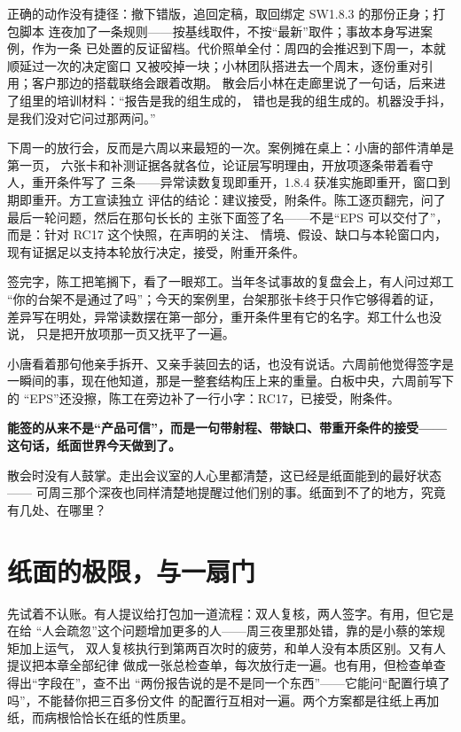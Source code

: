 正确的动作没有捷径：撤下错版，追回定稿，取回绑定 SW1.8.3 的那份正身；打包脚本
连夜加了一条规则——按基线取件，不按“最新”取件；事故本身写进案例，作为一条
已处置的反证留档。代价照单全付：周四的会推迟到下周一，本就顺延过一次的决定窗口
又被咬掉一块；小林团队搭进去一个周末，逐份重对引用；客户那边的搭载联络会跟着改期。
散会后小林在走廊里说了一句话，后来进了组里的培训材料：“报告是我的组生成的，
错也是我的组生成的。机器没手抖，是我们没对它问过那两问。”

下周一的放行会，反而是六周以来最短的一次。案例摊在桌上：小唐的部件清单是第一页，
六张卡和补测证据各就各位，论证层写明理由，开放项逐条带着看守人，重开条件写了
三条——异常读数复现即重开，1.8.4 获准实施即重开，窗口到期即重开。方工宣读独立
评估的结论：建议接受，附条件。陈工逐页翻完，问了最后一轮问题，然后在那句长长的
主张下面签了名——不是“EPS 可以交付了”，而是：针对 RC17 这个快照，在声明的关注、
情境、假设、缺口与本轮窗口内，现有证据足以支持本轮放行决定，接受，附重开条件。

签完字，陈工把笔搁下，看了一眼郑工。当年冬试事故的复盘会上，有人问过郑工
“你的台架不是通过了吗”；今天的案例里，台架那张卡终于只作它够得着的证，
差异写在明处，异常读数摆在第一部分，重开条件里有它的名字。郑工什么也没说，
只是把开放项那一页又抚平了一遍。

小唐看着那句他亲手拆开、又亲手装回去的话，也没有说话。六周前他觉得签字是
一瞬间的事，现在他知道，那是一整套结构压上来的重量。白板中央，六周前写下的
“EPS”还没擦，陈工在旁边补了一行小字：RC17，已接受，附条件。

\textbf{能签的从来不是“产品可信”，而是一句带射程、带缺口、带重开条件的接受——这句话，纸面世界今天做到了。}

散会时没有人鼓掌。走出会议室的人心里都清楚，这已经是纸面能到的最好状态——
可周三那个深夜也同样清楚地提醒过他们别的事。纸面到不了的地方，究竟有几处、在哪里？

\section{纸面的极限，与一扇门}

先试着不认账。有人提议给打包加一道流程：双人复核，两人签字。有用，但它是在给
“人会疏忽”这个问题增加更多的人——周三夜里那处错，靠的是小蔡的笨规矩加上运气，
双人复核执行到第两百次时的疲劳，和单人没有本质区别。又有人提议把本章全部纪律
做成一张总检查单，每次放行走一遍。也有用，但检查单查得出“字段在”，查不出
“两份报告说的是不是同一个东西”——它能问“配置行填了吗”，不能替你把三百多份文件
的配置行互相对一遍。两个方案都是往纸上再加纸，而病根恰恰长在纸的性质里。

